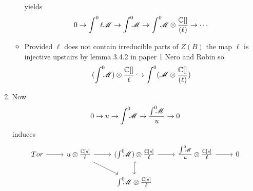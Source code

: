 \begin{enumerate}
\begin{itemize}
    yields
    $$0 \to \int^0  \ell \mathscr{M} \to \int^0 \mkern -8mu \mathscr{M} \to \int^0 \mkern -8mu \mathscr{M} \otimes \frac{\mathbb{C}[]}{(\ell)}\to \cdots$$
    \item Provided $\ell$ does not contain irreducible parts of $Z(B)$ the map $\ell$ is injective upstairs by lemma 3.4.2 in paper 1 Nero and Robin so
    $$(\int^0 \mkern -8mu \mathscr{M} )\otimes \frac{\mathbb{C}[]}{\ell} \hookrightarrow \int^0 (\mathscr{M} \otimes \frac{\mathbb{C}[]}{(\ell)}) $$
  \end{itemize}
  \item Now
  $$0 \to u \to \int^0 \mkern -8mu \mathscr{M} \to \frac{\int^0 \mkern -8mu \mathscr{M}}{u} \to 0 $$
  induces
  $$\begin{tikzcd}
    Tor\arrow{r} & u\otimes \frac{\C[s]}{\ell}\arrow{r}\arrow{rd} & (\Int \M) \otimes \frac{\C[s]}{\ell}\arrow{r}\arrow[hookrightarrow]{d} & \frac{\Int \M}{u} \otimes \frac{\C[s]}{\ell}\arrow{r} & 0\\
    & & \Int \M \otimes \frac{\C[s]}{\ell}
  \end{tikzcd} $$
  \end{enumerate}
